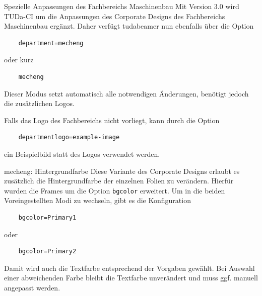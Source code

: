 \documentclass[
	ngerman,%
	aspectratio=169,%
	color={accentcolor=2d},
	logo=false,%
	colorframetitle=true,%
	]{tudabeamer}
\let\code\texttt
\begin{document}
\begin{frame}[fragile]{Spezielle Anpassungen des Fachbereichs Maschinenbau}
	Mit Version 3.0 wird TUDa-CI um die Anpassungen des Corporate Designs des Fachbereichs Maschinenbau ergänzt.
	Daher verfügt tudabeamer nun ebenfalls über die Option 
	\begin{verbatim}
	department=mecheng
	\end{verbatim}
	oder kurz 
	\begin{verbatim}
	mecheng
	\end{verbatim}
	Dieser Modus setzt automatisch alle notwendigen Änderungen, benötigt jedoch die zusätzlichen Logos.
	
	Falls das Logo des Fachbereichs nicht vorliegt, kann durch die Option
	\begin{verbatim}
	departmentlogo=example-image
	\end{verbatim} ein Beispielbild statt des Logos verwendet werden.
\end{frame}

\begin{frame}[fragile]{mecheng: Hintergrundfarbe}
	Diese Variante des Corporate Designs erlaubt es zusätzlich die Hintergrundfarbe der einzelnen Folien zu verändern. Hierfür wurden die Frames um die Option \code{bgcolor} erweitert. Um in die beiden Voreingestellten Modi zu wechseln, gibt es die Konfiguration
	\begin{verbatim}
	bgcolor=Primary1
	\end{verbatim}
	oder
	\begin{verbatim}
	bgcolor=Primary2
	\end{verbatim}
	Damit wird auch die Textfarbe entsprechend der Vorgaben gewählt. Bei Auswahl einer abweichenden Farbe bleibt die Textfarbe unverändert und muss ggf. manuell angepasst werden.
\end{frame}
\end{document}
